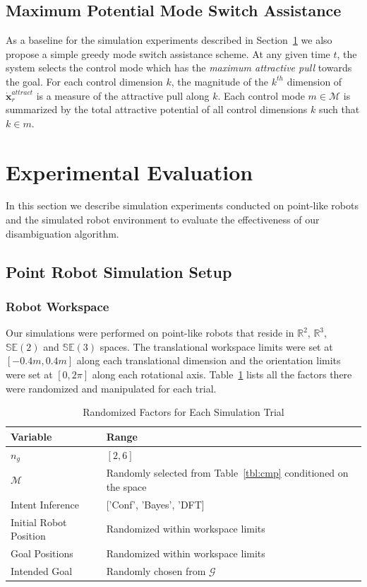 \documentclass[conference]{IEEEtran}
\begin{document}
\subsection{Maximum Potential Mode Switch Assistance}\label{ssec:maxpot}
As a baseline for the simulation experiments described in Section~\ref{sec:ed} we also propose a simple greedy mode switch assistance scheme. At any given time $t$, the system selects the control mode which has the \textit{maximum attractive pull} towards the goal. For each control dimension $k$, the magnitude of the $k^{th}$ dimension of $\dot{\boldsymbol{x}}_r^{attract}$ is a measure of the attractive pull along $k$. Each control mode $m \in \mathcal{M}$ is summarized by the total attractive potential of all control dimensions $k$ such that $k \in m$.
\section{Experimental Evaluation}\label{sec:ed}
In this section we describe simulation experiments conducted on point-like robots and the simulated robot environment to evaluate the effectiveness of our disambiguation algorithm.
\subsection{Point Robot Simulation Setup}
\subsubsection{Robot Workspace}
Our simulations were performed on point-like robots that reside in $\mathbb{R}^2$, $\mathbb{R}^3$, $\mathbb{SE}(2)$ and $\mathbb{SE}(3)$ spaces. The translational workspace limits were set at $[-0.4m, 0.4m]$ along each translational dimension and the orientation limits were set at $[0, 2\pi]$ along each rotational axis. Table~\ref{tbl:manip} lists all the factors there were randomized and manipulated for each trial. 
\begin{table}[t]
	\centering
	\begin{tabular}{|p{3cm}|p{3cm}|}
		\hline
		\textbf{Variable} &\textbf{Range}  \\ \hline
		$n_g$ &  $[2,6]$ \\ \hline
		$\mathcal{M}$ & Randomly selected from Table~\ref{tbl:cmp} conditioned on the space\\ \hline
		Intent Inference & ['Conf', 'Bayes', 'DFT] \\ \hline
		Initial Robot Position & Randomized within workspace limits \\ \hline
		Goal Positions & Randomized within workspace limits \\ \hline
		Intended Goal & Randomly chosen from $\mathcal{G}$ \\ \hline
	\end{tabular}
	\vspace{.2cm}
	\caption{Randomized Factors for Each Simulation Trial} 
	\label{tbl:manip}
	\vspace{-.5cm}
\end{table}
\end{document}
